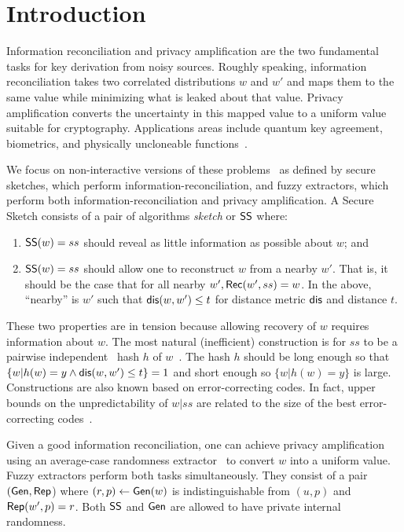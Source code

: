 
\section{Introduction}
Information reconciliation and privacy amplification are the two
fundamental tasks for key derivation from noisy sources.  Roughly
speaking, information reconciliation takes two correlated
distributions $w$ and $w'$ and maps them to the same value while
minimizing what is leaked about that value.  Privacy amplification
converts the uncertainty in this mapped value to a uniform value
suitable for cryptography.  Applications areas include quantum key
agreement, biometrics, and physically uncloneable
functions~\cite{bennett1988privacy,dodis2008fuzzy}.

We focus on non-interactive versions of these problems~\cite{dodis2008fuzzy} as defined by secure sketches, which perform information-recon\-ciliation, and fuzzy extractors, which perform both information-recon\-ciliation and privacy amplification. A Secure Sketch consists of a pair of algorithms \emph{sketch} or ${\mathsf{SS}}$ where:
\begin{enumerate}
\item ${\mathsf{SS}}(w) = ss$ should reveal as little information as possible about $w$; and
\item ${\mathsf{SS}}(w) =ss$ should allow one to reconstruct $w$ from a nearby $w'$. That is, it should be the case that for all nearby $w', {\mathsf{Rec}}(w', ss) = w$.  In the above, ``nearby'' is $w'$ such that $\mathsf{dis}(w,w')\le t$ for  distance metric $\mathsf{dis}$ and distance $t$.
\end{enumerate}
These two properties are in tension because allowing recovery of $w$ requires information about $w$.  The most natural (inefficient) construction is for $ss$ to be a pairwise independent~\cite{carter1977universal} hash $h$ of $w$~\cite{skoric2009efficient,fuller2016fuzzy,woodage2017new,fuller2020fuzzy}. The hash $h$ should be long enough so that $\{w | h(w) = y \wedge \mathsf{dis}(w, w')\le t\} =1$ and short enough so $\{w| h(w) = y\}$ is large. Constructions are also known based on error-correcting codes.  In fact, upper bounds on the unpredictability of $w | ss$ are related to the size of the best error-correcting codes~\cite{dodis2008fuzzy,fuller2020computational}. 

Given a good information reconciliation, one can achieve privacy amplification using an average-case randomness extractor~\cite{nisan1993randomness} to convert $w$ into a uniform value.
  Fuzzy extractors perform both tasks simultaneously.  They consist of a pair $({\mathsf{Gen}}, {\mathsf{Rep}}$) where $(r, p)\leftarrow {\ensuremath{\mathsf{Gen}}}(w)$ is indistinguishable from $(u, p)$ and ${\mathsf{Rep}}(w', p) =r$.  Both ${\mathsf{SS}}$ and ${\mathsf{Gen}}$ are allowed to have private internal randomness.
  
